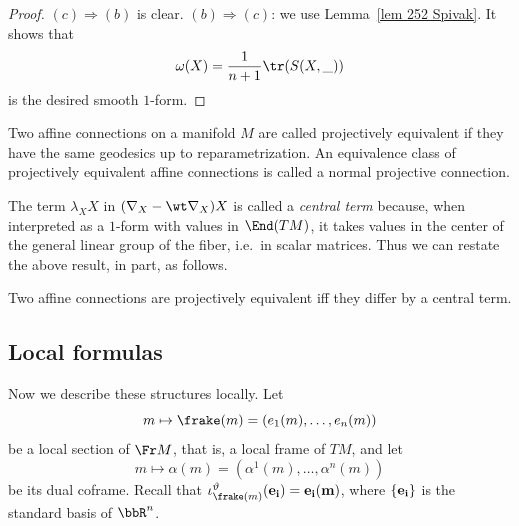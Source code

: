 \begin{proof}
    $(c)\Rightarrow (b)$ is clear. $(b)\Rightarrow(c)$: we use Lemma~\ref{lem 252 Spivak}. It shows that 
    \[\omega(X)=\frac{1}{n+1}\tr (S(X,\_))\]
    is the desired smooth $1$-form.
\end{proof}

\begin{defn}
    Two affine connections on a manifold $M$ are called projectively equivalent if they have the same geodesics up to reparametrization. An equivalence class of projectively equivalent affine connections is called a normal projective connection.
\end{defn}

The term $\lambda_X X$ in $(\nabla_X -\wt\nabla_X)X$ is called a \emph{central term} because, when interpreted as a $1$-form with values in $\End(TM)$, it takes values in the center of the general linear group of the fiber, i.e.\ in scalar matrices. Thus we can restate the above result, in part, as follows.

\begin{cor}
    Two affine connections are projectively equivalent iff they differ by a central term.
\end{cor}







\subsection{Local formulas}


Now we describe these structures locally. Let
\[m\mapsto \frake(m)=(e_1(m),\ldots,e_n(m))\]
be a local section of $\Fr M$, that is, a local frame of $TM$, and let 
\[m\mapsto \alpha(m)=(\alpha^1(m),\ldots,\alpha^n(m))\]
be its dual coframe. Recall that $\iota^\vartheta_{\frake(m)}(\bf{e}_i)=e_i(m)$, where $\{\bf{e}_i\}$ is the standard basis of $\bbR^n$.

